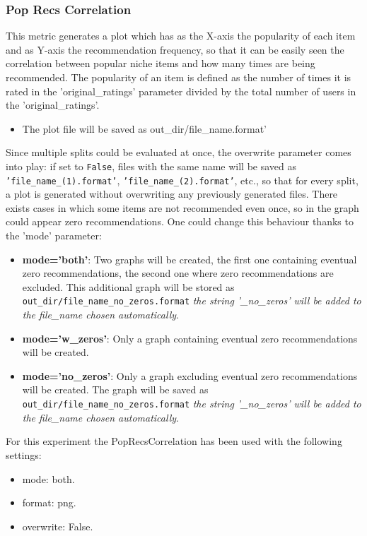 \documentclass[11pt]{article}
\begin{document}
\subsubsection{Pop Recs Correlation}\label{subsubsec:poprc}
This metric generates a plot which has as the X-axis the popularity of each item and as Y-axis the recommendation
frequency, so that it can be easily seen the correlation between popular niche items and how many times are being
recommended.
The popularity of an item is defined as the number of times it is rated in the 'original\_ratings' parameter
divided by the total number of users in the 'original\_ratings'.
\begin{itemize}
    \item The plot file will be saved as out\_dir/file\_name.format'
\end{itemize}
\hfill\break
\hfill\break
Since multiple splits could be evaluated at once, the overwrite parameter comes into play: if set to \texttt{False},
files with the same name will be saved as \texttt{'file\_name\_(1).format'}, \texttt{'file\_name\_(2).format'}, etc.,
so that for every split, a plot is generated without overwriting any previously generated files.
\hfill\break
\hfill\break
There exists cases in which some items are not recommended even once, so in the graph could appear
zero recommendations.
One could change this behaviour thanks to the 'mode' parameter:
\begin{itemize}
    \item \textbf{mode='both'}: Two graphs will be created, the first one containing eventual zero recommendations, the
      second one where zero recommendations are excluded. This additional graph will be stored as
      \texttt{out\_dir/file\_name\_no\_zeros.format} \textit{the string '\_no\_zeros' will be added to the file\_name chosen automatically}.
    \item \textbf{mode='w\_zeros'}: Only a graph containing eventual zero recommendations will be created.
    \item \textbf{mode='no\_zeros'}: Only a graph excluding eventual zero recommendations will be created. The graph will be
      saved as \texttt{out\_dir/file\_name\_no\_zeros.format} \textit{the string '\_no\_zeros' will be added to the file\_name chosen automatically}.
\end{itemize}
\hfill\break
\hfill\break
For this experiment the PopRecsCorrelation has been used with the following settings:
\begin{itemize}
    \item mode: both.
    \item format: png.
    \item overwrite: False.
\end{itemize}
\hfill\break
\hfill\break
\end{document}
